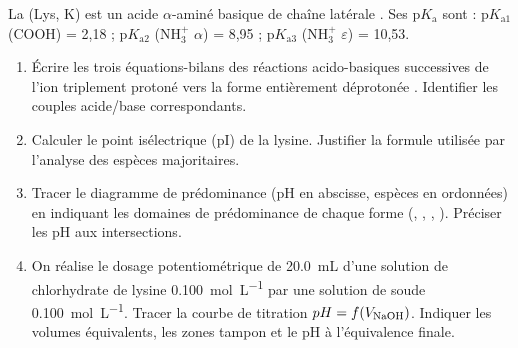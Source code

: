 \documentclass[11pt]{article}
\begin{document}
\begin{exercice}
La  (Lys, K) est un acide $\alpha$-aminé basique de chaîne latérale . Ses p$K_\text{a}$ sont : p$K_{\text{a1}}$ (COOH) = 2,18 ; p$K_{\text{a2}}$ (NH$_3^+$ $\alpha$) = 8,95 ; p$K_{\text{a3}}$ (NH$_3^+$ $\varepsilon$) = 10,53.
\begin{enumerate}
    \item Écrire les trois équations-bilans des réactions acido-basiques successives de l'ion triplement protoné  vers la forme entièrement déprotonée . Identifier les couples acide/base correspondants.
    \item Calculer le point isélectrique (pI) de la lysine. Justifier la formule utilisée par l'analyse des espèces majoritaires.
    \item Tracer le diagramme de prédominance (pH en abscisse, espèces en ordonnées) en indiquant les domaines de prédominance de chaque forme (, , , ). Préciser les pH aux intersections.
    \item On réalise le dosage potentiométrique de \SI{20,0}{mL} d'une solution de chlorhydrate de lysine \SI{0,100}{mol.L^{-1}} par une solution de soude \SI{0,100}{mol.L^{-1}}. Tracer la courbe de titration $pH = f(V_{\ce{NaOH}})$. Indiquer les volumes équivalents, les zones tampon et le pH à l'équivalence finale.
\end{enumerate}
\end{exercice}
\end{document}
